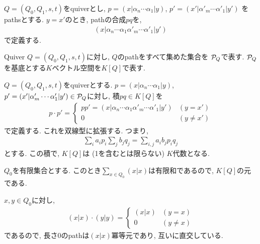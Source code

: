 \begin{definition}
  $Q=(Q_0,Q_1,s,t)$をquiverとし,
  $p=(x|\alpha_n\cdots\alpha_1|y)$,
  $p'=(x'|\alpha'_m\cdots\alpha'_1|y')$
  をpathsとする.
  $y=x'$のとき,
  pathの合成$pq$を,
  \begin{align*}
    (x|\alpha_n\cdots\alpha_1\alpha'_m\cdots\alpha'_1|y')
  \end{align*}
  で定義する.
\end{definition}

\begin{definition}
  Quiver $Q=(Q_0,Q_1,s,t)$に対し,
  $Q$のpathをすべて集めた集合を
  $\mathcal{P}_Q$で表す.
  $\mathcal{P}_Q$を基底とする$K$ベクトル空間を$K[Q]$で表す.
\end{definition}
$Q=(Q_0,Q_1,s,t)$をquiverとする.
$p=(x|\alpha_n\cdots\alpha_1|y)$,
$p'=(x'|\alpha'_m\cdots\alpha'_1|y')\in \mathcal{P}_Q$に対し,
積$pq\in K[Q]$を
\begin{align*}
  p\cdot p'=
  \begin{cases}
    pp'=(x|\alpha_n\cdots\alpha_1\alpha'_m\cdots\alpha'_1|y') &(y=x')\\
      0&(y\neq x')
  \end{cases}
\end{align*}
で定義する.
これを双線型に拡張する.
つまり,
\begin{align*}
  \sum_{i}a_ip_i\sum_{j}b_jq_j = \sum_{i,j}a_ib_jp_iq_j
\end{align*}
とする.
この積で, $K[Q]$は
(1を含むとは限らない)
$K$代数となる.
\begin{remark}
  $Q_0$を有限集合とする.
  このとき$\sum_{x\in Q_0}(x|x)$は有限和であるので,
  $K[Q]$の元である.
\end{remark}
\begin{remark}
  $x,y\in Q_0$に対し,
  \begin{align*}
    (x|x)\cdot (y|y)=
    \begin{cases}
      (x|x) & (y=x)\\
      0&(y\neq x)
    \end{cases}
  \end{align*}
  であるので, 長さ0のpathは$(x|x)$冪等元であり,
  互いに直交している.
\end{remark}

